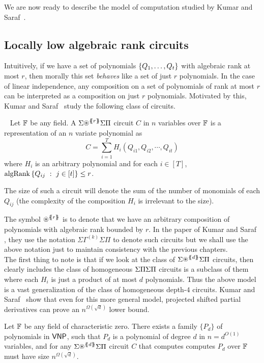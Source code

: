 \noindent
We are now ready to describe the model of computation studied by Kumar and Saraf~\cite{KS16lowrank}. 

\subsection{Locally low algebraic rank circuits}


Intuitively, if we have a set of polynomials $\left\{Q_1,\ldots, Q_t\right\}$ with algebraic rank at most $r$, then morally this set \emph{behaves} like a set of just $r$ polynomials. In the case of linear independence, any composition on a set of polynomials of rank at most $r$ can be interpreted as a composition on just $r$ polynomials. Motivated by this, Kumar and Saraf~\cite{KS16lowrank} study the following class of circuits. 

\begin{definition}~\label{def:lb model}
Let $\mathbb{F}$ be any field. A $\SASP{r}$ circuit $C$ in $n$ variables over $\mathbb{F}$ is a representation of an $n$ variate polynomial as 
\[C =  \sum_{i = 1}^T  H_i(Q_{i1},  Q_{i2},  \cdots, Q_{it}) \]  
where $H_i$ is an arbitrary polynomial and for each $i\in [T]$, $\operatorname{\mathrm{algRank}}\left\{{Q_{ij}}\ : \ {j\in [t]}\right\} \leq r$. 

The size of such a circuit will denote the sum of the number of monomials of each $Q_{ij}$ (the complexity of the composition $H_i$ is irrelevant to the size). 
\end{definition}

The symbol $\circast^{\set{\!\!\set{r}\!\!}}$ is to denote that we have an arbitrary composition of polynomials with algebraic rank bounded by $r$.
In the paper of Kumar and Saraf \cite{KS16lowrank}, they use the notation $\Sigma\Gamma^{(k)}\Sigma\Pi$ to denote such circuits but we shall use the above notation just to maintain consistency with the previous chapters. \\

The first thing to note is that if we look at the class of $\SASP{d}$ circuits, then clearly includes the class of homogeneous $\Sigma\Pi\Sigma\Pi$ circuits is a subclass of them where each $H_i$ is just a product of at most $d$ polynomials. Thus the above model is a vast generalization of the class of homogeneous depth-$4$ circuits. Kumar and Saraf~\cite{KS16lowrank} show that even for this more general model, projected shifted partial derivatives can prove an $n^{\Omega(\sqrt{d})}$ lower bound. 

\begin{theorem} \label{thm:locally-lowalgrank}
Let $\mathbb{F}$ be any field of characteristic zero. There exists a family $\{P_d\}$ of polynomials in $\mathsf{VNP}$, such that $P_d$ is a polynomial of degree $d$ in $n = d^{O(1)}$ variables, and for any $\SASP{d}$ circuit $C$ that computes computes $P_d$ over $\mathbb{F}$ must have size $n^{\Omega(\sqrt{d})}$.
\end{theorem} 

